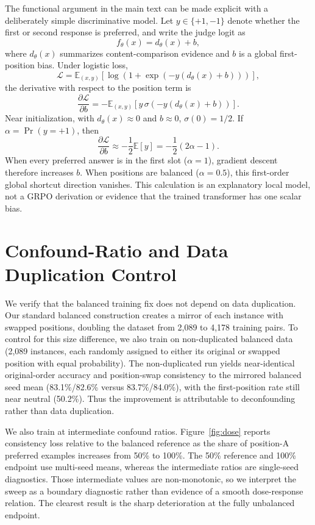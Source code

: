 \documentclass[letterpaper]{article}
\begin{document}
The functional argument in the main text can be made explicit with a deliberately simple discriminative model. Let $y \in \{+1,-1\}$ denote whether the first or second response is preferred, and write the judge logit as
\[
f_\theta(x)=d_\theta(x)+b,
\]
where $d_\theta(x)$ summarizes content-comparison evidence and $b$ is a global first-position bias. Under logistic loss,
\[
\mathcal{L}=\mathbb{E}_{(x,y)}
\left[\log\!\left(1+\exp\!\left(-y(d_\theta(x)+b)\right)\right)\right],
\]
the derivative with respect to the position term is
\[
\frac{\partial \mathcal{L}}{\partial b}
=-\mathbb{E}_{(x,y)}
\left[y\,\sigma\!\left(-y(d_\theta(x)+b)\right)\right].
\]
Near initialization, with $d_\theta(x)\approx0$ and $b\approx0$, $\sigma(0)=1/2$. If $\alpha=\Pr(y=+1)$, then
\[
\frac{\partial \mathcal{L}}{\partial b}
\approx-\frac{1}{2}\mathbb{E}[y]
=-\frac{1}{2}(2\alpha-1).
\]
When every preferred answer is in the first slot ($\alpha=1$), gradient descent therefore increases $b$. When positions are balanced ($\alpha=0.5$), this first-order global shortcut direction vanishes. This calculation is an explanatory local model, not a GRPO derivation or evidence that the trained transformer has one scalar bias.

\section{Confound-Ratio and Data Duplication Control}
\label{app:dose}

We verify that the balanced training fix does not depend on data duplication. Our standard balanced construction creates a mirror of each instance with swapped positions, doubling the dataset from 2,089 to 4,178 training pairs. To control for this size difference, we also train on non-duplicated balanced data (2,089 instances, each randomly assigned to either its original or swapped position with equal probability). The non-duplicated run yields near-identical original-order accuracy and position-swap consistency to the mirrored balanced seed mean (83.1\%/82.6\% versus 83.7\%/84.0\%), with the first-position rate still near neutral (50.2\%). Thus the improvement is attributable to deconfounding rather than data duplication.

We also train at intermediate confound ratios. Figure~\ref{fig:dose} reports consistency loss relative to the balanced reference as the share of position-A preferred examples increases from 50\% to 100\%. The 50\% reference and 100\% endpoint use multi-seed means, whereas the intermediate ratios are single-seed diagnostics. Those intermediate values are non-monotonic, so we interpret the sweep as a boundary diagnostic rather than evidence of a smooth dose-response relation. The clearest result is the sharp deterioration at the fully unbalanced endpoint.
\end{document}
